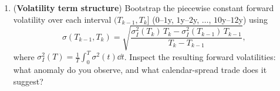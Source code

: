 \begin{problem}
\begin{enumerate}
        \item (\textbf{Volatility term structure}) Bootstrap the piecewise constant forward volatility over each interval $(T_{k-1}, T_k]$ ($0$--$1$y, $1$y--$2$y, $\ldots$, $10$y--$12$y) using
        \[
        \sigma(T_{k-1}, T_k) = \sqrt{\frac{\sigma_I^2(T_k)\,T_k - \sigma_I^2(T_{k-1})\,T_{k-1}}{T_k - T_{k-1}}},
        \]
        where $\sigma_I^2(T) = \frac{1}{T}\int_0^T \sigma^2(t)\dd t$. Inspect the resulting forward volatilities: what anomaly do you observe, and what calendar-spread trade does it suggest?
    \end{enumerate}
\end{problem}
